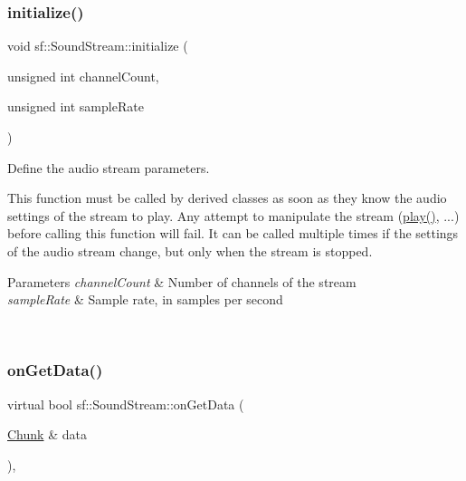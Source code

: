 \mbox{\label{classsf_1_1_sound_stream_a9c351711198ee1aa77c2fefd3ced4d2c}} 
\subsubsection{\texorpdfstring{initialize()}{initialize()}}
{\footnotesize\ttfamily void sf\+::\+Sound\+Stream\+::initialize (\begin{DoxyParamCaption}\item[{unsigned int}]{channel\+Count,  }\item[{unsigned int}]{sample\+Rate }\end{DoxyParamCaption})\hspace{0.3cm}{\ttfamily [protected]}}



Define the audio stream parameters. 

This function must be called by derived classes as soon as they know the audio settings of the stream to play. Any attempt to manipulate the stream (\mbox{\hyperlink{classsf_1_1_sound_stream_afdc08b69cab5f243d9324940a85a1144}{play()}}, ...) before calling this function will fail. It can be called multiple times if the settings of the audio stream change, but only when the stream is stopped.


\begin{DoxyParams}{Parameters}
{\em channel\+Count} & Number of channels of the stream \\
\hline
{\em sample\+Rate} & Sample rate, in samples per second \begin{DoxyVerb}\end{DoxyVerb}
 \\
\hline
\end{DoxyParams}
\mbox{\label{classsf_1_1_sound_stream_a968ec024a6e45490962c8a1121cb7c5f}} 
\subsubsection{\texorpdfstring{onGetData()}{onGetData()}}
{\footnotesize\ttfamily virtual bool sf\+::\+Sound\+Stream\+::on\+Get\+Data (\begin{DoxyParamCaption}\item[{\mbox{\hyperlink{structsf_1_1_sound_stream_1_1_chunk}{Chunk}} \&}]{data }\end{DoxyParamCaption})\hspace{0.3cm}{\ttfamily [protected]}, {}}




